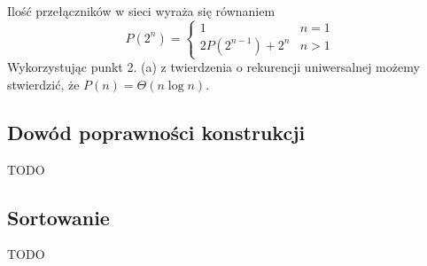 Ilość przełączników w sieci wyraża się równaniem
$$
 P(2^n) = 
  \begin{cases} 
   1 & n = 1 \\
   2P(2^{n - 1}) + 2^n & n > 1
  \end{cases}
$$
Wykorzystując punkt 2. (a) z twierdzenia o rekurencji uniwersalnej możemy stwierdzić, że $P(n) = \Theta(n \log n)$.

\subsection{Dowód poprawności konstrukcji}
TODO
\subsection{Sortowanie}
TODO
